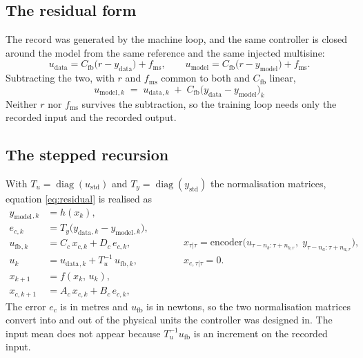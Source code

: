 \documentclass[11pt]{article}
\newcommand{\diag}{\operatorname{diag}}
\newcommand{\Cfb}{C_{\mathrm{fb}}}
\newcommand{\fms}{f_{\mathrm{ms}}}
\newcommand{\ufb}{u_{\mathrm{fb}}}
\newcommand{\udata}{u_{\mathrm{data}}}
\newcommand{\umodel}{u_{\mathrm{model}}}
\newcommand{\ydata}{y_{\mathrm{data}}}
\newcommand{\ymodel}{y_{\mathrm{model}}}
\newcommand{\Tu}{T_{u}}
\newcommand{\Ty}{T_{y}}
\begin{document}
\subsection{The residual form}

The record was generated by the machine loop, and the same controller is closed around the model
from the same reference and the same injected multisine:
\begin{equation}
  \udata = \Cfb\bigl(r - \ydata\bigr) + \fms ,
  \qquad
  \umodel = \Cfb\bigl(r - \ymodel\bigr) + \fms .
  \label{eq:twoloops}
\end{equation}
Subtracting the two, with $r$ and $\fms$ common to both and $\Cfb$ linear,
\begin{equation}
  \boxed{\;
    \umodel{}_{,k}
    \;=\;
    \udata{}_{,k}
    \;+\;
    \Cfb\bigl(\ydata - \ymodel\bigr)_k \; }
  \label{eq:residual}
\end{equation}
Neither $r$ nor $\fms$ survives the subtraction, so the training loop needs only the recorded
input and the recorded output.

\subsection{The stepped recursion}

With $\Tu = \diag(u_{\mathrm{std}})$ and $\Ty = \diag(y_{\mathrm{std}})$ the normalisation
matrices, equation \eqref{eq:residual} is realised as
\begin{equation}
  \begin{aligned}
    \ymodel{}_{,k} &= h(x_k) , \\
    e_{c,k}        &= \Ty\bigl(\ydata{}_{,k} - \ymodel{}_{,k}\bigr) , \\
    \ufb{}_{,k}    &= C_c\,x_{c,k} + D_c\,e_{c,k} , \\
    u_k            &= \udata{}_{,k} + \Tu^{-1}\,\ufb{}_{,k} , \\
    x_{k+1}        &= f(x_k,\, u_k) , \\
    x_{c,k+1}      &= A_c\,x_{c,k} + B_c\,e_{c,k} ,
  \end{aligned}
  \qquad
  \begin{aligned}
    &x_{\tau|\tau}   = \mathrm{encoder}\bigl(u_{\tau-n_b:\tau+n_{b,r}},\;
                                             y_{\tau-n_a:\tau+n_{a,r}}\bigr) , \\[1mm]
    &x_{c,\tau|\tau} = 0 .
  \end{aligned}
  \label{eq:recursion}
\end{equation}
The error $e_{c}$ is in metres and $\ufb$ is in newtons, so the two normalisation matrices convert
into and out of the physical units the controller was designed in. The input mean does not appear
because $\Tu^{-1}\ufb$ is an increment on the recorded input.
\end{document}
